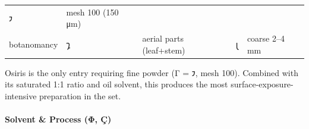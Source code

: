 \documentclass[12pt,a4paper]{article}
\begin{document}
\begin{longtable}[]{@{}lllll@{}}
\begin{minipage}[t]{0.17\columnwidth}
𐑲\strut
\end{minipage} & \begin{minipage}[t]{0.17\columnwidth}\raggedright
mesh 100 (150 μm)\strut
\end{minipage}\tabularnewline
\begin{minipage}[t]{0.17\columnwidth}\raggedright
botanomancy\strut
\end{minipage} & \begin{minipage}[t]{0.17\columnwidth}\raggedright
𐑡\strut
\end{minipage} & \begin{minipage}[t]{0.17\columnwidth}\raggedright
aerial parts (leaf+stem)\strut
\end{minipage} & \begin{minipage}[t]{0.17\columnwidth}\raggedright
𐑚\strut
\end{minipage} & \begin{minipage}[t]{0.17\columnwidth}\raggedright
coarse 2--4 mm\strut
\end{minipage}\tabularnewline
\bottomrule
\end{longtable}

Osiris is the only entry requiring fine powder (Γ = 𐑲, mesh 100).
Combined with its saturated 1:1 ratio and oil solvent, this produces the
most surface-exposure-intensive preparation in the set.

\hypertarget{solvent-process-ux3c6-uxe7}{%
\paragraph{Solvent \& Process (Φ, Ç)}\label{solvent-process-ux3c6-uxe7}}
\end{document}

